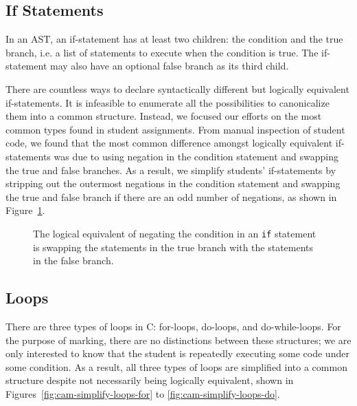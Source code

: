 \subsection{If Statements}

In an AST, an if-statement has at least two children: the condition and the true branch, i.e. a list of statements to execute when the condition is true. The if-statement may also have an optional false branch as its third child.

There are countless ways to declare syntactically different but logically equivalent if-statements. It is infeasible to enumerate all the possibilities to canonicalize them into a common structure. Instead, we focused our efforts on the most common types found in student assignments. From manual inspection of student code, we found that the most common difference amongst  logically equivalent if-statements was due to using negation in the condition statement and swapping the true and false branches. As a result, we simplify students' if-statements by stripping out the outermost negations in the condition statement and swapping the true and false branch if there are an odd number of negations, as shown in Figure~\ref{fig:cam-simplify-if-neg}.

\begin{figure}
\begin{minipage}{.45\textwidth}

\end{minipage}
\hfill
\begin{minipage}{.45\textwidth}

\end{minipage}
\caption[Negation in If Statement]{The logical equivalent of negating the condition in an \texttt{if} statement is swapping the statements in the true branch with the statements in the false branch.}
\label{fig:cam-simplify-if-neg}
\end{figure}

\subsection{Loops}
\label{sec:cam-loops}

There are three types of loops in C: for-loops, do-loops, and do-while-loops. For the purpose of marking, there are no distinctions between these structures; we are only interested to know that the student is repeatedly executing some code under some condition. As a result, all three types of loops are simplified into a common structure despite not necessarily being logically equivalent, shown in Figures~\ref{fig:cam-simplify-loops-for} to \ref{fig:cam-simplify-loops-do}.

